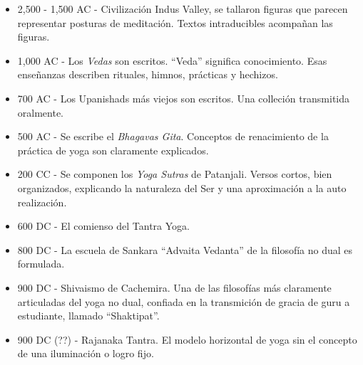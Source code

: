 \begin{itemize}
	\item 2,500 - 1,500 AC - Civilización Indus Valley, se tallaron figuras que parecen representar posturas de meditación. Textos intraducibles acompañan las figuras.
	\item 1,000 AC - Los \textit{Vedas} son escritos. ``Veda'' significa conocimiento. Esas enseñanzas describen rituales, himnos, prácticas y hechizos.
	\item 700 AC - Los Upanishads más viejos son escritos. Una colleción transmitida oralmente.
	\item 500 AC - Se escribe el \textit{Bhagavas Gita}. Conceptos de renacimiento de la práctica de yoga son claramente explicados.
	\item 200 CC - Se componen los \textit{Yoga Sutras} de Patanjali. Versos cortos, bien organizados, explicando la naturaleza del Ser y una aproximación a la auto realización.
	\item 600 DC - El comienso del Tantra Yoga.
	\item 800 DC - La escuela de Sankara ``Advaita Vedanta'' de la filosofía no dual es formulada.
	\item 900 DC - Shivaismo de Cachemira. Una de las filosofías más claramente articuladas del yoga no dual, confiada en la transmición de gracia de guru a estudiante, llamado ``Shaktipat''.
	\item 900 DC (??) - Rajanaka Tantra. El modelo horizontal de yoga sin el concepto de una iluminación o logro fijo.
\end{itemize}

